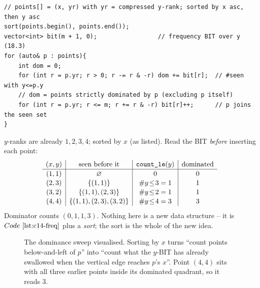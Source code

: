 \begin{lstlisting}[caption={2D dominance count: sort by x, frequency BIT over compressed y}, label={lst:c14-dom}]
// points[] = (x, yr) with yr = compressed y-rank; sorted by x asc, then y asc
sort(points.begin(), points.end());
vector<int> bit(m + 1, 0);                 // frequency BIT over y (18.3)
for (auto& p : points){
    int dom = 0;
    for (int r = p.yr; r > 0; r -= r & -r) dom += bit[r];  // #seen with y<=p.y
    // dom = points strictly dominated by p (excluding p itself)
    for (int r = p.yr; r <= m; r += r & -r) bit[r]++;      // p joins the seen set
}
\end{lstlisting}

\begin{tracebox}[Dominance on \((1,1),(2,3),(3,2),(4,4)\)]
\(y\)-ranks are already \(1,2,3,4\); sorted by \(x\) (as listed).  Read the
BIT \emph{before} inserting each point:
\[
\renewcommand{\arraystretch}{1.1}
\begin{array}{c|c|c|c}
(x,y) & \text{seen before it} & \code{count\_le}(y) & \text{dominated}\\ \hline
(1,1) & \varnothing & 0 & 0\\
(2,3) & \{(1,1)\} & \#y\!\le\!3=1 & 1\\
(3,2) & \{(1,1),(2,3)\} & \#y\!\le\!2=1 & 1\\
(4,4) & \{(1,1),(2,3),(3,2)\} & \#y\!\le\!4=3 & 3
\end{array}
\]
Dominator counts \((0,1,1,3)\).  Nothing here is a new data structure -- it is
\(\coderef{c14-freq}\) plus a \emph{sort}; the sort is the whole of the new
idea.
\end{tracebox}

\begin{figure}[H]
\centering
{}
\caption{The dominance sweep visualised.  Sorting by \(x\) turns ``count points
below-and-left of \(p\)'' into ``count what the \(y\)-BIT has already swallowed
when the vertical edge reaches \(p\)'s \(x\)''.  Point \((4,4)\) sits with all
three earlier points inside its dominated quadrant, so it reads \(3\).}
\label{fig:c14-schedule}
\end{figure}

